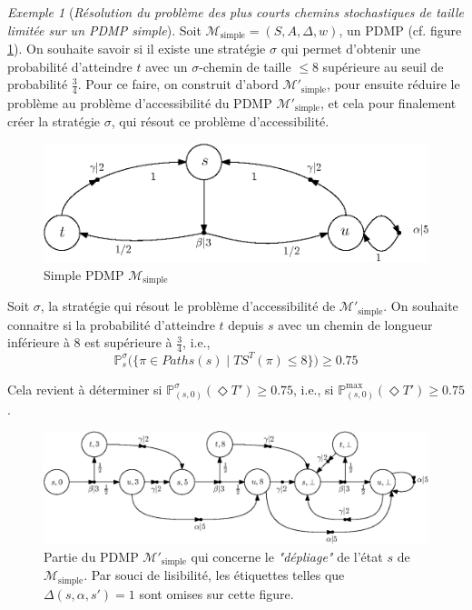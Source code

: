 \documentclass[12pt,a4paper]{report}
\theoremstyle{definition}%
\theoremstyle{remark}
\newtheorem{example}{Exemple}[chapter]
\newcommand{\pr}{\mathbb{P}}
\begin{document}
\begin{example}[\textit{Résolution du problème des plus courts chemins stochastiques de taille limitée sur un PDMP simple}] \label{sspp-example}
Soit $\mathcal{M}_{\text{simple}} = (S, A, \Delta, w)$, un PDMP (cf. figure
\ref{sspp1-simple}). On souhaite savoir si il existe une stratégie $\sigma$ qui permet d'obtenir une probabilité d'atteindre $t$ avec un
$\sigma$-chemin de taille $\leq 8$ supérieure au seuil de probabilité
$\frac{3}{4}$.
Pour ce faire, on construit d'abord
$\mathcal{M}'_{\text{simple}}$, pour ensuite réduire le problème au problème
d'accessibilité du PDMP $\mathcal{M}'_{\text{simple}}$, et cela pour finalement
créer la stratégie $\sigma$, qui résout ce problème d'accessibilité.

\begin{figure}[H]
	\centering
	\includegraphics{figures/sspp1.eps}
	\caption{Simple PDMP $\mathcal{M}_{\text{simple}}$}
	\label{sspp1-simple}
\end{figure}
Soit $\sigma$, la stratégie qui résout le problème d'accessibilité de
$\mathcal{M}'_{\text{simple}}$.
On souhaite connaitre si la probabilité d'atteindre $t$ depuis $s$ avec un chemin
de longueur inférieure à $8$ est supérieure à $\frac{3}{4}$, i.e.,
\[
\pr^{\sigma}_s\big( \{ \pi \in Paths(s) \; | \; TS^T(\pi) \leq 8\}\big)
\geq 0.75
\]

Cela revient à déterminer si $\pr^{\sigma}_{(s, 0)}(\Diamond T') \geq 0.75$, i.e.,
si $\pr^{\max}_{(s, 0)}(\Diamond T') \geq 0.75$.
\begin{figure}[H]
	\centering
	\includegraphics{figures/sspp2.eps}
	\captionsetup{justification=centering}
	\caption{Partie du PDMP $\mathcal{M}'_{\text{simple}}$ qui concerne le
		\textit{"dépliage"} de l'état $s$ de $\mathcal{M}_{\text{simple}}$. Par souci
		de lisibilité, les étiquettes telles que $\Delta(s, \alpha, s') = 1$ sont
		omises sur cette figure.}
	\label{sspp2-unfolding}
\end{figure}


\end{example}
\end{document}
